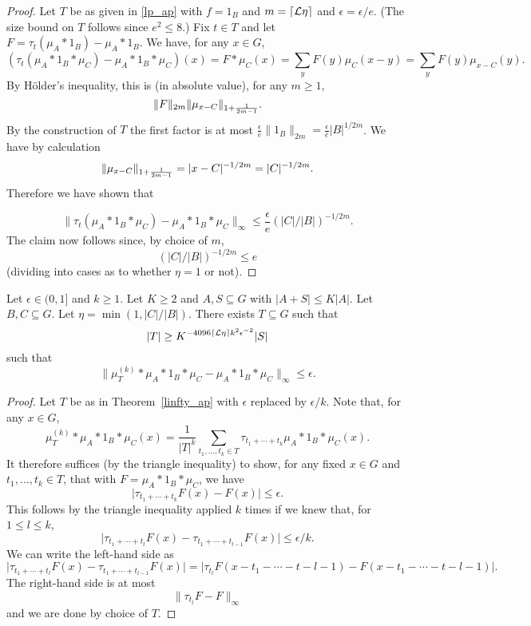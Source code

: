 \begin{proof}
\leanok
{} Let $T$ be as given in \ref{lp_ap}
with $f=1_B$ and $m=\lceil \mathcal{L}{\eta}\rceil$ and $\epsilon=\epsilon/e$. (The size bound on $T$ follows since $e^2\leq 8$.) Fix $t\in T$ and let $F=\tau_t(\mu_A\ast 1_B)-\mu_A\ast 1_B$. We have, for any $x\in G$,
\[(\tau_t(\mu_A\ast 1_B\ast \mu_C)-\mu_A\ast 1_B\ast \mu_C)(x)=F\ast \mu_C(x)=\sum_y F(y)\mu_{C}(x-y)=\sum_yF(y)\mu_{x-C}(y).\]
By Hölder's inequality, this is (in absolute value), for any $m\geq 1$,
\[\lVert F\rVert_{2m}\lVert \mu_{x-C}\rVert_{1+\frac{1}{2m-1}}.\]
By the construction of $T$ the first factor is at most
$\frac{\epsilon}{e}\| 1_B\|_{2m}=\frac{\epsilon}{e}\lvert B\rvert^{1/2m}$.
We have by calculation
\[\lVert \mu_{x-C}\rVert_{1+\frac{1}{2m-1}}=\lvert x-C\rvert^{-1/2m}=\lvert C\rvert^{-1/2m}.\]
Therefore we have shown that

\[\| \tau_t(\mu_A\ast 1_B\ast \mu_C)-\mu_A\ast 1_B\ast \mu_C\|_{\infty}\leq \frac{\epsilon}{e}(\lvert C\rvert/\lvert B\rvert)^{-1/2m}.\]
The claim now follows since, by choice of $m$,
\[(\lvert C\rvert/\lvert B\rvert)^{-1/2m}\leq e\]
(dividing into cases as to whether $\eta=1$ or not).
\end{proof}


\begin{theorem}
\label{linfty_ap_boosted}

Let $\epsilon\in (0,1]$ and $k\geq 1$. Let $K\geq 2$ and $A,S\subseteq G$ with $\lvert A+S\rvert\leq K\lvert A\rvert$.
Let $B,C\subseteq G$. Let $\eta=\min(1,\lvert C\rvert/\lvert B\rvert)$. There exists $T\subseteq G$ such that
\[\lvert T\rvert \geq K^{-4096\lceil \mathcal{L}{\eta}\rceil k^2\epsilon^{-2}}\lvert S\rvert\]
such that
\[\| \mu_T^{(k)}\ast \mu_A\ast 1_B\ast \mu_C-\mu_A\ast 1_B\ast \mu_C\|_{\infty}\leq \epsilon.\]
\end{theorem}

\begin{proof}
Let $T$ be as in Theorem~\ref{linfty_ap} with $\epsilon$ replaced by $\epsilon/k$. Note that, for any $x\in G$,
\[\mu_T^{(k)}\ast \mu_A\ast 1_B\ast \mu_C(x)=\frac{1}{\lvert T\rvert^k}\sum_{t_1,\ldots,t_k\in T}\tau_{t_1+\cdots+t_k}\mu_A\ast 1_B\ast \mu_C(x).\]
It therefore suffices (by the triangle inequality) to show, for any fixed $x\in G$ and $t_1,\ldots,t_k\in T$, that with $F=\mu_A\ast 1_B\ast \mu_C$, we have
\[\lvert \tau_{t_1+\cdots+t_k}F(x)-F(x)\rvert \leq \epsilon.\]
This follows by the triangle inequality applied $k$ times if we knew that, for $1\leq l\leq k$,
\[\lvert \tau_{t_1+\cdots+t_l}F(x)-\tau_{t_1+\cdots+t_{l-1}}F(x)\rvert \leq \epsilon/k.\]
We can write the left-hand side as
\[\lvert \tau_{t_1+\cdots+t_l}F(x)-\tau_{t_1+\cdots+t_{l-1}}F(x)\rvert=\lvert \tau_{t_l}F(x-t_1-\cdots-t-{l-1})-F(x-t_1-\cdots-t-{l-1})\rvert.\]
The right-hand side is at most
\[\| \tau_{t_l}F-F\|_\infty\]
and we are done by choice of $T$.
\end{proof}
